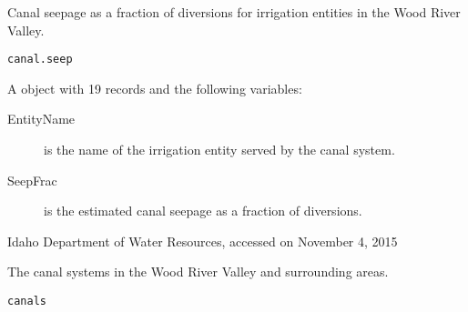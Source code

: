 \documentclass[a4paper]{book}
\begin{document}
%
\begin{Description}\relax
Canal seepage as a fraction of diversions for irrigation entities in the Wood River Valley.
\end{Description}
%
\begin{Usage}
\begin{verbatim}
canal.seep
\end{verbatim}
\end{Usage}
%
\begin{Format}
A  object with 19 records and the following variables:
\begin{description}

\item[EntityName] is the name of the irrigation entity served by the canal system.
\item[SeepFrac] is the estimated canal seepage as a fraction of diversions.

\end{description}

\end{Format}
%
\begin{Source}\relax
Idaho Department of Water Resources, accessed on November 4, 2015
\end{Source}
%
\begin{SeeAlso}\relax
{}
\end{SeeAlso}
%
\begin{Examples}
\end{Examples}
%
\begin{Description}\relax
The canal systems in the Wood River Valley and surrounding areas.
\end{Description}
%
\begin{Usage}
\begin{verbatim}
canals
\end{verbatim}
\end{Usage}
\end{document}
